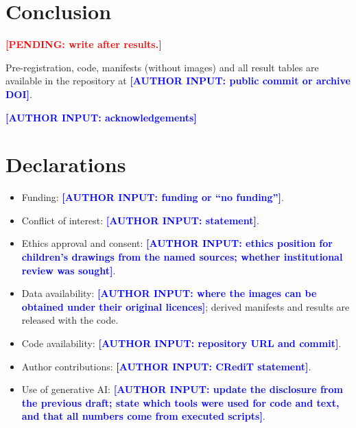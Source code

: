 \documentclass[pdflatex,sn-mathphys-num]{sn-jnl}
\newcommand{\pending}[1]{\textcolor{red}{\textbf{[PENDING: #1]}}}
\newcommand{\authorinput}[1]{\textcolor{blue}{\textbf{[AUTHOR INPUT: #1]}}}
\begin{document}
\section{Conclusion}\label{sec:conclusion}
\pending{write after results.}

\backmatter

 Pre-registration, code, manifests (without images) and all result tables are available in the repository at \authorinput{public commit or archive DOI}.

 \authorinput{acknowledgements}

\section*{Declarations}
\begin{itemize}
\item Funding: \authorinput{funding or ``no funding''}.
\item Conflict of interest: \authorinput{statement}.
\item Ethics approval and consent: \authorinput{ethics position for children's drawings from the named sources; whether institutional review was sought}.
\item Data availability: \authorinput{where the images can be obtained under their original licences}; derived manifests and results are released with the code.
\item Code availability: \authorinput{repository URL and commit}.
\item Author contributions: \authorinput{CRediT statement}.
\item Use of generative AI: \authorinput{update the disclosure from the previous draft; state which tools were used for code and text, and that all numbers come from executed scripts}.
\end{itemize}


\end{document}
